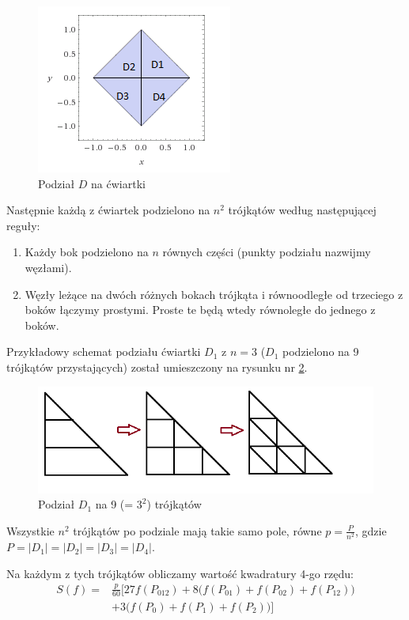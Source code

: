 \documentclass[12pt]{article}
\begin{document}
	\begin{figure}[H]
		\centering
		\includegraphics[scale=1.5]{images/D-quarters.png}
		\caption{Podział $D$ na ćwiartki}
		\label{D-quarters}
	\end{figure}

	Następnie każdą z ćwiartek podzielono na $n^2$ trójkątów według następującej reguły:
	\begin{enumerate}
		\item Każdy bok podzielono na $n$ równych części (punkty podziału nazwijmy węzłami).
		\item Węzły leżące na dwóch różnych bokach trójkąta i równoodległe od trzeciego z boków łączymy prostymi. Proste te będą wtedy równoległe do jednego z boków.
	\end{enumerate}

	Przykładowy schemat podziału ćwiartki $D_1$ z $n = 3$ ($D_1$ podzielono na 9 trójkątów przystających) został umieszczony na rysunku nr \ref{triangle-division}.
	
	\begin{figure}[H]
		\centering
		\includegraphics[]{images/triangle-division.png}
		\caption{Podział $D_1$ na 9 (= $3^2$) trójkątów}
		\label{triangle-division}
	\end{figure}

	Wszystkie $n^2$ trójkątów po podziale mają takie samo pole, równe $p = \frac{P}{n^2}$, gdzie $P = |D_1| = |D_2| = |D_3| = |D_4|$.
	
	Na każdym z tych trójkątów obliczamy wartość kwadratury 4-go rzędu:
	\begin{align}
		S(f) = & \frac{p}{60} \Bigg[  27f(P_{012}) + 8 \Big( f(P_{01}) + f(P_{02}) + f(P_{12}) \Big)  \nonumber \\
		       & + 3\Big( f(P_0) + f(P_1) + f(P_2) \Big) \Bigg] \label{kwadratura}
	\end{align}
	
\end{document}
